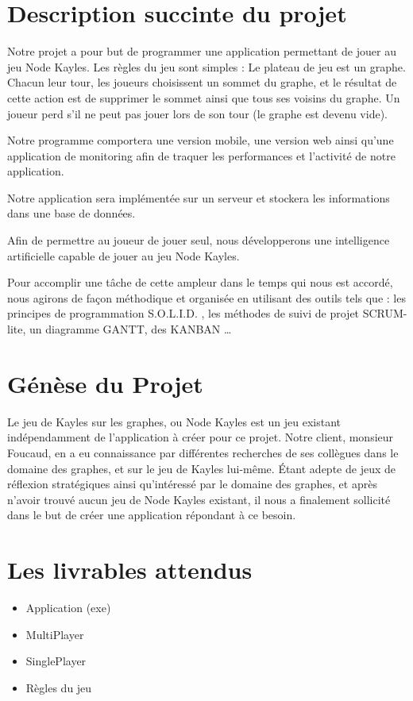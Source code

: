 \documentclass[a4paper, 12pt,table]{report}
\begin{document}
\section{Description succinte du projet}
Notre projet a pour but de programmer une application permettant de jouer au jeu Node Kayles. Les règles du jeu sont simples :
Le plateau de jeu est un graphe. Chacun leur tour, les joueurs choisissent un sommet du graphe, et le résultat de cette action est de supprimer le sommet ainsi que tous ses voisins du graphe. Un joueur perd s'il ne peut pas jouer lors de son tour (le graphe est devenu vide).

Notre programme comportera une version mobile, une version web ainsi qu'une application de monitoring afin de traquer les performances et l'activité de notre application.

Notre application sera implémentée sur un serveur et stockera les informations dans une base de données.

Afin de permettre au joueur de jouer seul, nous développerons une intelligence artificielle capable de jouer au jeu Node Kayles.

Pour accomplir une tâche de cette ampleur dans le temps qui nous est accordé, nous agirons de façon méthodique et organisée en utilisant des outils tels que : les principes de programmation S.O.L.I.D. , les méthodes de suivi de projet SCRUM-lite, un diagramme GANTT, des KANBAN …

\section{Génèse du Projet}

Le jeu de Kayles sur les graphes, ou Node Kayles est un jeu existant indépendamment de l’application à créer pour ce projet.
Notre client, monsieur Foucaud, en a eu connaissance par différentes recherches de ses collègues dans le domaine des graphes, et sur le jeu de Kayles lui-même.
Étant adepte de jeux de réflexion stratégiques ainsi qu’intéressé par le domaine des graphes, et après n’avoir trouvé aucun jeu de Node Kayles existant, il nous a finalement sollicité dans le but de créer une application répondant à ce besoin.


\clearpage

\section{Les livrables attendus}
\begin{itemize}
	\item{Application (exe)}
	\item{MultiPlayer}
    \item{SinglePlayer}
    \item{Règles du jeu}
\end{itemize}
\end{document}
